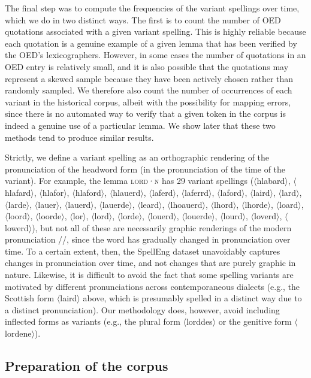 \documentclass[doc,biblatex]{apa7}
\newcommand\lemma[2]{\textsc{#1·#2}}
\newcommand\spelling[1]{\allowbreak$\langle$#1$\rangle$}
\newcommand\pronunciation[1]{/\textdoulos{#1}/}
\begin{document}
The final step was to compute the frequencies of the variant spellings over time, which we do in two distinct ways. The first is to count the number of OED quotations associated with a given variant spelling. This is highly reliable because each quotation is a genuine example of a given lemma that has been verified by the OED's lexicographers. However, in some cases the number of quotations in an OED entry is relatively small, and it is also possible that the quotations may represent a skewed sample because they have been actively chosen rather than randomly sampled. We therefore also count the number of occurrences of each variant in the historical corpus, albeit with the possibility for mapping errors, since there is no automated way to verify that a given token in the corpus is indeed a genuine use of a particular lemma. We show later that these two methods tend to produce similar results.

Strictly, we define a variant spelling as an orthographic rendering of the pronunciation of the headword form (in the pronunciation of the time of the variant). For example, the lemma \lemma{lord}{n} has 29 variant spellings (\spelling{hlabard}, \spelling{hlafard}, \spelling{hlafor}, \spelling{hlaford}, \spelling{hlauerd}, \spelling{laferd}, \spelling{laferrd}, \spelling{laford}, \spelling{laird}, \spelling{lard}, \spelling{larde}, \spelling{lauer}, \spelling{lauerd}, \spelling{lauerde}, \spelling{leard}, \spelling{lhoauerd}, \spelling{lhord}, \spelling{lhorde}, \spelling{loard}, \spelling{loord}, \spelling{loorde}, \spelling{lor}, \spelling{lord}, \spelling{lorde}, \spelling{louerd}, \spelling{louerde}, \spelling{lourd}, \spelling{loverd}, \spelling{lowerd}), but not all of these are necessarily graphic renderings of the modern pronunciation \pronunciation{lɔrd}, since the word has gradually changed in pronunciation over time. To a certain extent, then, the SpellEng dataset unavoidably captures changes in pronunciation over time, and not changes that are purely graphic in nature. Likewise, it is difficult to avoid the fact that some spelling variants are motivated by different pronunciations across contemporaneous dialects (e.g., the Scottish form \spelling{laird} above, which is presumably spelled in a distinct way due to a distinct pronunciation). Our methodology does, however, avoid including inflected forms as variants (e.g., the plural form \spelling{lorddes} or the genitive form \spelling{lordene}).

\subsection{Preparation of the corpus}
\end{document}
